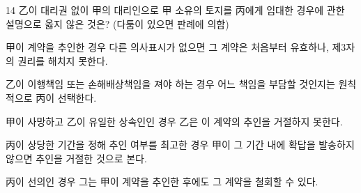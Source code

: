 \begin{question}{14}
乙이 대리권 없이 甲의 대리인으로 甲 소유의 토지를 丙에게 임대한 경우에 관한 설명으로 옳지 않은 것은? (다툼이 있으면 판례에 의함)
\begin{choices}
  \item 甲이 계약을 추인한 경우 다른 의사표시가 없으면 그 계약은 처음부터 유효하나, 제3자의 권리를 해치지 못한다.
  \item 乙이 이행책임 또는 손해배상책임을 져야 하는 경우 어느 책임을 부담할 것인지는 원칙적으로 丙이 선택한다.
  \item 甲이 사망하고 乙이 유일한 상속인인 경우 乙은 이 계약의 추인을 거절하지 못한다.
  \item 丙이 상당한 기간을 정해 추인 여부를 최고한 경우 甲이 그 기간 내에 확답을 발송하지 않으면 추인을 거절한 것으로 본다.
  \item 丙이 선의인 경우 그는 甲이 계약을 추인한 후에도 그 계약을 철회할 수 있다.
\end{choices}
\end{question}
